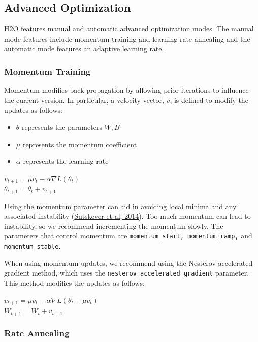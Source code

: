 \subsection{Advanced Optimization} 
H2O features manual and automatic advanced optimization modes. The manual mode features include momentum training and learning rate annealing and the automatic mode features an adaptive learning rate.

\subsubsection{Momentum Training}
\label{sssec:MomentumTraining}
Momentum modifies back-propagation by allowing prior iterations to influence the current version. In particular, a velocity vector, $v$, is defined to modify the updates as follows: 
\begin{itemize}
\item  $\theta$ represents the parameters $W,B$
\item $\mu$ represents the momentum coefficient
\item $\alpha$ represents the learning rate
\end{itemize}

\begin{center}
$v_{t+1} = \mu v_t - \alpha \nabla L(\theta_t)$
\\
$\theta_{t+1} = \theta_t + v_{t+1}$
\end{center}
Using the momentum parameter can aid in avoiding 
local minima and any associated instability (\href{http://www.cs.toronto.edu/~fritz/absps/momentum.pdf}{Sutskever et al, 2014}). Too much momentum can lead to instability, so we recommend incrementing the momentum slowly.  The parameters that control momentum are \texttt{momentum\_start, momentum\_ramp,} and \texttt{momentum\_stable}.

When using momentum updates, we recommend using the Nesterov accelerated gradient method, which uses the \texttt{nesterov\_accelerated\_gradient} parameter. This method modifies the updates as follows: 
\begin{center}
$v_{t+1} = \mu v_t - \alpha \nabla L(\theta_t + \mu v_t)$
\\
$W_{t+1} = W_t + v_{t+1}$
\end{center}
\subsubsection{Rate Annealing} 
\label{sssec:RateAnnealing}

